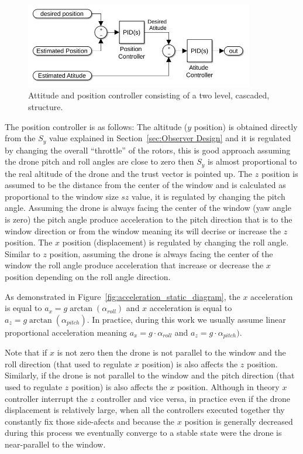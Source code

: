 \documentclass[ twoside, 12pt ]{article}
\begin{document}
\begin{figure} %
    \centerline{\includegraphics[width=100mm]{two_level_controller.jpg}}
    \caption{Attitude and position controller consisting of a two level, cascaded, structure.}
    \label{fig:controllerStracture}
\end{figure}

The position controller is as follows:
The altitude ($y$ position) is obtained directly from the $S_y$ value explained in Section~\ref{sec:Observer Design} and it is regulated by changing the overall ``throttle'' of the rotors, this is good approach assuming the drone pitch and roll angles are close to zero then $S_y$ is almost proportional to the real altitude of the drone and the trust vector is pointed up.
The $z$ position is assumed to be the distance from the center of the window and is calculated as proportional to the window size $sz$ value, it is regulated by changing the pitch angle. Assuming the drone is always facing the center of the window (yaw angle is zero) the pitch angle produce acceleration to the pitch direction that is to the window direction or from the window meaning its will decrise or increase the $z$ position.
The $x$ position (displacement) is regulated by changing the roll angle. Similar to $z$ position, assuming the drone is always facing the center of the window the roll angle produce acceleration that increase or decrease the $x$ position depending on the roll angle direction.

As demonstrated in Figure~\ref{fig:acceleration_static_diagram}, the $x$ acceleration is equal to $a_x=g \arctan(\alpha_{roll})$ and $x$ acceleration is equal to $a_z=g \arctan(\alpha_{pitch})$. 
In practice, during this work we usually assume linear proportional acceleration meaning $a_x=g \cdot \alpha_{roll}$ and $a_z=g \cdot \alpha_{pitch})$.

Note that if $x$ is not zero then the drone is not parallel to the window and the roll direction (that used to regulate $x$ position) is also affects the $z$ position.
Similarly, if the drone is not parallel to the window and the pitch direction (that used to regulate $z$ position) is also affects the $x$ position.
Although in theory $x$ controller interrupt the $z$ controller and vice versa, in practice even if the drone displacement is relatively large, when all the controllers executed together thy constantly fix those side-afects and because the $x$ position is generally decreased during this process we eventually converge to a stable state were the drone is near-parallel to the window.
\end{document}

